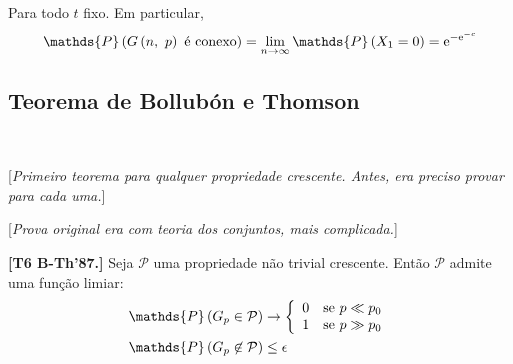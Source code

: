 Para todo $t$ fixo. Em particular,
\[
  \mathds{P}\left(G\left(n,\ p\vphantom{1j}\right) \text{ é conexo}\vphantom{1j}\right) = \lim_{n\rightarrow\infty} \mathds{P}\left(X_1=0\vphantom{1j}\right)=\mathrm{e}^{-\mathrm{e}^{-c}}
\]

\clearpage
\subsection{Teorema de Bollubón e Thomson}$ $\newline

[\textit{Primeiro teorema para qualquer propriedade crescente. Antes, era preciso provar para cada uma.}]

[\textit{Prova original era com teoria dos conjuntos, mais complicada.}]

\begin{teorema}
  \normalfont\textbf{[T6 B-Th'87.]}
  Seja $\mathcal{P}$ uma propriedade não trivial crescente. Então $\mathcal{P}$ admite uma função limiar:
  \vspace*{-\baselineskip}
  \begin{align*}
    \mathds{P}\left(G_p\in\mathcal{P}\vphantom{1j}\right)
      &\rightarrow \left\{\begin{array}{ll}
                      0 & \text{se } p \ll p_0  \\
                      1 & \text{se } p \gg p_0  \\
                    \end{array}\vphantom{1j}\right.                                                                  \\
    \mathds{P}\left(G_p\not\in\mathcal{P}\vphantom{1j}\right)
      &\leq\epsilon
  \end{align*}
\end{teorema}

